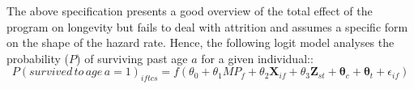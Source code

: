 The above specification presents a good overview of the total effect of the program on longevity but fails to deal with attrition and assumes a specific form on the shape of the hazard rate. Hence, the following logit model analyses the probability ($P$) of surviving past age $a$ for a given individual::
$$
P(survived\,to\,age\,a=1)_{iftcs} = f(\theta_0 + \theta_1MP_f + \theta_2\mathbf{X}_{if} + \theta_3\mathbf{Z}_{st} + \mathbf{\theta}_c + \mathbf{\theta}_t + \epsilon_{if})
$$